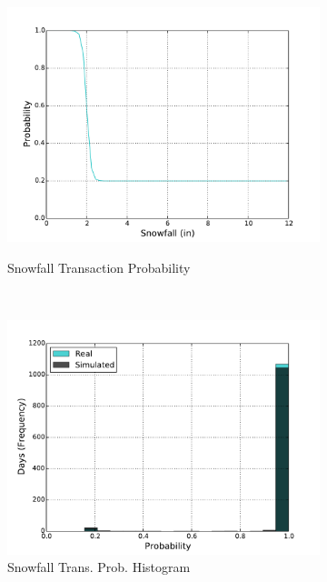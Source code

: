 \documentclass[11pt, letterpaper]{article}
\begin{document}
\begin{figure}[H]
\begin{subfigure}[b]{0.45\textwidth}
    \includegraphics[width=\textwidth]{figures/snowfall_trans_prob.pdf}
    \label{fig:analysis-raw}
    \caption{Snowfall Transaction Probability}
  \end{subfigure}
  ~
  \begin{subfigure}[b]{0.45\textwidth}
    \includegraphics[width=\textwidth]{figures/snowfall_trans_prob_hist.pdf}
    \caption{Snowfall Trans. Prob. Histogram}
  \end{subfigure}
  ~
  \begin{subfigure}[b]{0.45\textwidth}

\end{subfigure}
\end{figure}
\end{document}
